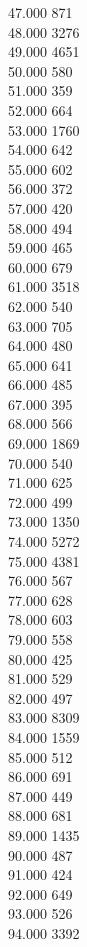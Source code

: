 { 47.000	871 \\
 48.000	3276 \\
 49.000	4651 \\
 50.000	580 \\
 51.000	359 \\
 52.000	664 \\
 53.000	1760 \\
 54.000	642 \\
 55.000	602 \\
 56.000	372 \\
 57.000	420 \\
 58.000	494 \\
 59.000	465 \\
 60.000	679 \\
 61.000	3518 \\
 62.000	540 \\
 63.000	705 \\
 64.000	480 \\
 65.000	641 \\
 66.000	485 \\
 67.000	395 \\
 68.000	566 \\
 69.000	1869 \\
 70.000	540 \\
 71.000	625 \\
 72.000	499 \\
 73.000	1350 \\
 74.000	5272 \\
 75.000	4381 \\
 76.000	567 \\
 77.000	628 \\
 78.000	603 \\
 79.000	558 \\
 80.000	425 \\
 81.000	529 \\
 82.000	497 \\
 83.000	8309 \\
 84.000	1559 \\
 85.000	512 \\
 86.000	691 \\
 87.000	449 \\
 88.000	681 \\
 89.000	1435 \\
 90.000	487 \\
 91.000	424 \\
 92.000	649 \\
 93.000	526 \\
 94.000	3392 \\
}
